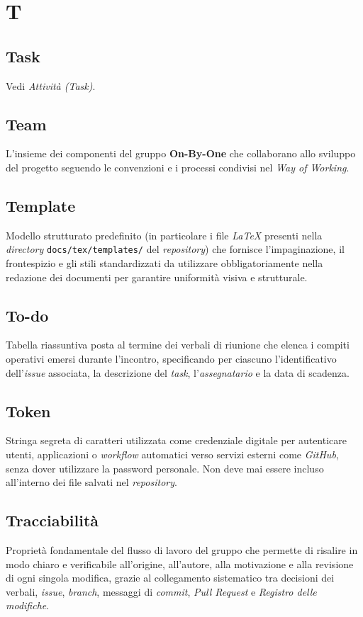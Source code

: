 \documentclass[11pt, a4paper]{article}
\begin{document}
\section*{T}

\subsection*{Task}
Vedi \textit{Attività (Task)}.

\subsection*{Team}
L'insieme dei componenti del gruppo \textbf{On-By-One} che collaborano allo sviluppo del progetto seguendo le convenzioni e i processi condivisi nel \textit{Way of Working}.

\subsection*{Template}
Modello strutturato predefinito (in particolare i file \textit{LaTeX} presenti nella \textit{directory} \texttt{docs/tex/templates/} del \textit{repository}) che fornisce l'impaginazione, il frontespizio e gli stili standardizzati da utilizzare obbligatoriamente nella redazione dei documenti per garantire uniformità visiva e strutturale.

\subsection*{To-do}
Tabella riassuntiva posta al termine dei verbali di riunione che elenca i compiti operativi emersi durante l'incontro, specificando per ciascuno l'identificativo dell'\textit{issue} associata, la descrizione del \textit{task}, l'\textit{assegnatario} e la data di scadenza.

\subsection*{Token}
Stringa segreta di caratteri utilizzata come credenziale digitale per autenticare utenti, applicazioni o \textit{workflow} automatici verso servizi esterni come \textit{GitHub}, senza dover utilizzare la password personale. Non deve mai essere incluso all'interno dei file salvati nel \textit{repository}.

\subsection*{Tracciabilità}
Proprietà fondamentale del flusso di lavoro del gruppo che permette di risalire in modo chiaro e verificabile all'origine, all'autore, alla motivazione e alla revisione di ogni singola modifica, grazie al collegamento sistematico tra decisioni dei verbali, \textit{issue}, \textit{branch}, messaggi di \textit{commit}, \textit{Pull Request} e \textit{Registro delle modifiche}.
\end{document}
